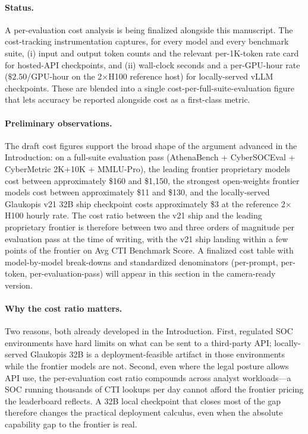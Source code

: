 \documentclass[unnumsec,webpdf,contemporary,large]{oup-authoring-template}
\theoremstyle{thmstyleone}
\theoremstyle{thmstyletwo}
\theoremstyle{thmstylethree}
\begin{document}
\paragraph{Status.}
A per-evaluation cost analysis is being finalized alongside this manuscript. The cost-tracking instrumentation captures, for every model and every benchmark suite, (i) input and output token counts and the relevant per-1K-token rate card for hosted-API checkpoints, and (ii) wall-clock seconds and a per-GPU-hour rate ($\$2.50$/GPU-hour on the 2$\times$H100 reference host) for locally-served vLLM checkpoints. These are blended into a single cost-per-full-suite-evaluation figure that lets accuracy be reported alongside cost as a first-class metric.

\paragraph{Preliminary observations.}
The draft cost figures support the broad shape of the argument advanced in the Introduction: on a full-suite evaluation pass (AthenaBench + CyberSOCEval + CyberMetric 2K+10K + MMLU-Pro), the leading frontier proprietary models cost between approximately \$160 and \$1{,}150, the strongest open-weights frontier models cost between approximately \$11 and \$130, and the locally-served Glaukopis v21 32B ship checkpoint costs approximately \$3 at the reference 2$\times$H100 hourly rate. The cost ratio between the v21 ship and the leading proprietary frontier is therefore between two and three orders of magnitude per evaluation pass at the time of writing, with the v21 ship landing within a few points of the frontier on Avg CTI Benchmark Score. A finalized cost table with model-by-model break-downs and standardized denominators (per-prompt, per-token, per-evaluation-pass) will appear in this section in the camera-ready version.

\paragraph{Why the cost ratio matters.}
Two reasons, both already developed in the Introduction. First, regulated SOC environments have hard limits on what can be sent to a third-party API; locally-served Glaukopis 32B is a deployment-feasible artifact in those environments while the frontier models are not. Second, even where the legal posture allows API use, the per-evaluation cost ratio compounds across analyst workloads---a SOC running thousands of CTI lookups per day cannot afford the frontier pricing the leaderboard reflects. A 32B local checkpoint that closes most of the gap therefore changes the practical deployment calculus, even when the absolute capability gap to the frontier is real.
\end{document}
